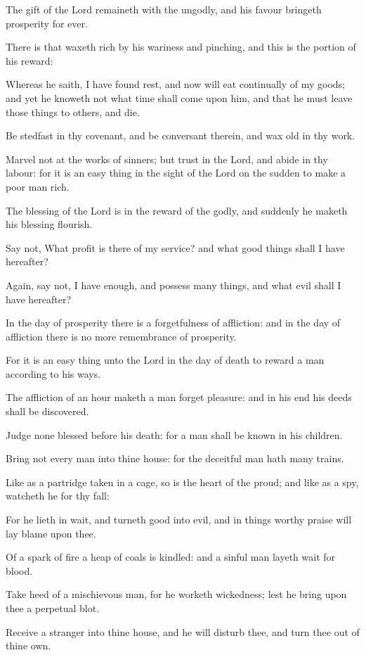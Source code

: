 {\par }{\PP {}The gift of the Lord remaineth with the ungodly, and his favour bringeth prosperity for ever.
\par }{\PP {}There is that waxeth rich by his wariness and pinching, and this is the portion of his reward:
\par }{\PP {}Whereas he saith, I have found rest, and now will eat continually of my goods; and yet he knoweth not what time shall come upon him, and that he must leave those things to others, and die.
\par }{\PP {}Be stedfast in thy covenant, and be conversant therein, and wax old in thy work.
\par }{\PP {}Marvel not at the works of sinners; but trust in the Lord, and abide in thy labour: for it is an easy thing in the sight of the Lord on the sudden to make a poor man rich.
\par }{\PP {}The blessing of the Lord is in the reward of the godly, and suddenly he maketh his blessing flourish.
\par }{\PP {}Say not, What profit is there of my service? and what good things shall I have hereafter?
\par }{\PP {}Again, say not, I have enough, and possess many things, and what evil shall I have hereafter?
\par }{\PP {}In the day of prosperity there is a forgetfulness of affliction: and in the day of affliction there is no more remembrance of prosperity.
\par }{\PP {}For it is an easy thing unto the Lord in the day of death to reward a man according to his ways.
\par }{\PP {}The affliction of an hour maketh a man forget pleasure: and in his end his deeds shall be discovered.
\par }{\PP {}Judge none blessed before his death: for a man shall be known in his children.
\par }{\PP {}Bring not every man into thine house: for the deceitful man hath many trains.
\par }{\PP {}Like as a partridge taken
{} in a cage, so is the heart of the proud; and like as a spy, watcheth he for thy fall:
\par }{\PP {}For he lieth in wait, and turneth good into evil, and in things worthy praise will lay blame upon thee.
\par }{\PP {}Of a spark of fire a heap of coals is kindled: and a sinful man layeth wait for blood.
\par }{\PP {}Take heed of a mischievous man, for he worketh wickedness; lest he bring upon thee a perpetual blot.
\par }{\PP {}Receive a stranger into thine house, and he will disturb thee, and turn thee out of thine own.

}
